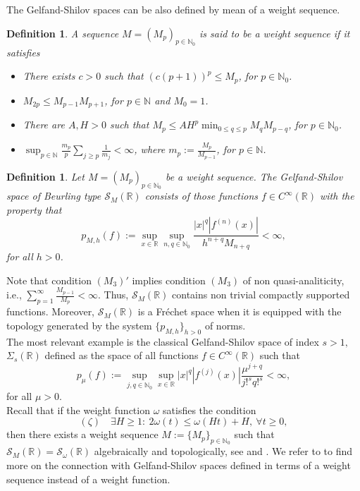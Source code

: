 \documentclass[12pt,reqno]{amsart} %
\newtheorem{definition}[theorem]{Definition}
\numberwithin{equation}{section}
\begin{document}
The Gelfand-Shilov spaces can be  also defined by mean of a weight sequence. 

\begin{definition}\label{weight-sequence} A
	sequence $M=(M_p)_{p\in\mathbb{N}_0}$ is said to be  a weight sequence if it satisfies
	\begin{itemize}
		\item[$(M_0)$] There exists $c >0$ such that $(c(p +1))^p\leq M_p$, for $p\in\mathbb{N}_0$.
		\item[$(M_1)$] $M_{2p}\leq M_{p-1}M_{p+1}$, for  $p\in\mathbb{N}$ and $M_0=1$.
		\item[$(M_2)$] There are $A, H>0$ such that $M_p\leq AH^p\min_{0\leq q\leq p}M_qM_{p-q}$, for $p \in\mathbb{N}_0$.
		\item[$(M_3)'$] $\sup_{p\in\mathbb{N}}\frac{m_p}{p}\sum_{j\geq p}\frac{1}{m_j}<\infty$, where $m_p:=\frac{M_p}{M_{p-1}}$, for $p\in\mathbb{N}$.
	\end{itemize}
\end{definition}

\begin{definition}\label{GS-sequence} Let $M=(M_p)_{p\in\mathbb{N}_0}$ be a weight sequence. The Gelfand-Shilov space of Beurling type $\mathcal{S}_M({\mathbb{R}})$ consists of those functions $f\in C^\infty(\mathbb{R})$ with the property that 
	\[
	p_{M,h}(f):=\sup_{x\in\mathbb{R}}\sup_{n,q\in\mathbb{N}_0}\frac{|x|^q|f^{(n)}(x)|}{h^{n+q}M_{n+q}}<\infty,
	\]
	for all $h>0$.
\end{definition}

Note that condition $(M_3)'$ implies condition $(M_3)$ of non quasi-analiticity, i.e.,  $\sum_{p=1}^\infty\frac{M_{p-1}}{M_p}<\infty$. Thus, $\mathcal{S}_M({\mathbb{R}})$   contains non trivial compactly supported functions. Moreover, 
$\mathcal{S}_M({\mathbb{R}})$ is a Fr\'echet space when it is equipped with the topology generated by the system $\{p_{M,h}\}_{h>0}$ of norms. \\

The most relevant example is the classical Gelfand-Shilov space of index $s>1,$ $\Sigma_s(\mathbb{R})$ defined as the space of all functions $f\in C^\infty(\mathbb{R})$ such that
\[
p_\mu(f):=\sup_{j,q\in\mathbb{N}_0}\sup_{x\in \mathbb{R}}|x|^q|f^{(j)}(x)|\frac{\mu^{j+q}}{j!^sq!^s}<\infty,
\]
for all $\mu>0$.\\


Recall that if the weight function $\omega$ satisfies the condition
\begin{equation}\label{C.Sequence}
	(\zeta)\quad \exists H\geq 1:\ 2\omega(t)\leq \omega(Ht)+H, \ \forall t\geq 0,
\end{equation}
then there exists a weight sequence $M:=\{M_p\}_{p\in\mathbb{N}_0}$ such that $\mathcal{S}_M({\mathbb{R}})=\mathcal{S}_\omega(\mathbb{R})$ algebraically and topologically, see \cite[Corollary 16]{BMM} and \cite[Section 3]{BJON}. We refer to \cite{jmaa} to find more on the connection with Gelfand-Shilov spaces defined in terms of a weight sequence instead of a weight function.\\
\end{document}
